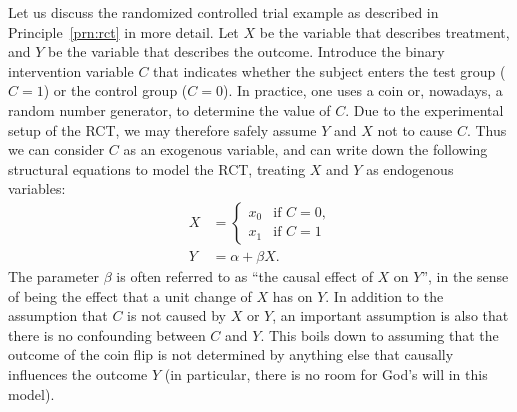 Let us discuss the randomized controlled trial example as described in Principle~\ref{prn:rct} in more detail.
Let $X$ be the variable that describes treatment, and $Y$ be the variable that describes the outcome.
Introduce the binary intervention variable $C$ that indicates whether the subject enters the
test group ($C=1$) or the control group ($C=0$). In practice, one uses a coin or, nowadays, a 
random number generator, to determine the value of $C$. Due to the experimental setup of the RCT, 
we may therefore safely assume $Y$ and $X$ not to cause $C$. Thus we can consider $C$ as an 
exogenous variable, and can write down the following structural equations to model the RCT,
treating $X$ and $Y$ as endogenous variables:
  \begin{align*}
    X &= \begin{cases}
      x_0 & \text{if $C=0$,} \\
      x_1 & \text{if $C=1$} 
    \end{cases} \\
    Y &= \alpha + \beta X.
  \end{align*}
The parameter $\beta$ is often referred to as ``the causal effect of $X$ on $Y$'', in the sense
of being the effect that a unit change of $X$ has on $Y$.
In addition to the assumption that $C$ is not caused by $X$ or $Y$, an important assumption is
also that there is no confounding between $C$ and $Y$. This boils down to assuming that the outcome
of the coin flip is not determined by anything else that causally influences the outcome $Y$
(in particular, there is no room for God's will in this model).


